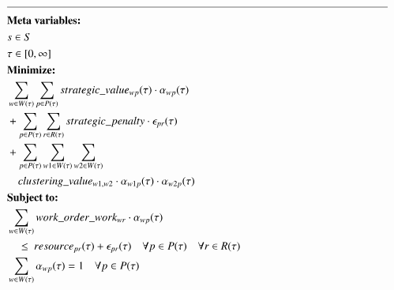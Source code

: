 \begin{alignat}{2}
	& \text{\rule{\linewidth}{0.4pt}} \notag\\
	& \textbf{Meta variables:} \notag\\
	& \ElementScheduler \in \SetScheduler \notag\\
	& \tau \in [0, \infty] \notag\\
	& \textbf{Minimize:} \notag                                                                                                                                                        \\
	& \sum_{\ElementWorkOrder \in \SetWorkOrder{}} \sum_{\ElementPeriod \in \SetPeriod} \ParStrategicValue \cdot \VarStrategicWorkOrderAssignment{\ElementWorkOrder}{\ElementPeriod}  \\ 
	& + \sum_{\ElementPeriod \in \SetPeriod} \sum_{\ElementResource \in \SetResource} \ParStrategicPenalty \cdot \VarStrategicExcess                                                   \\
	& + \sum_{\ElementPeriod \in \SetPeriod} \sum_{\ElementWorkOrder1 \in \SetWorkOrder{}} \sum_{\ElementWorkOrder2 \in \SetWorkOrder{}} \notag                                       \\ 
	& \quad \ParClusteringValue \cdot \VarStrategicWorkOrderAssignment{\ElementWorkOrder1}{\ElementPeriod} \cdot \VarStrategicWorkOrderAssignment{\ElementWorkOrder2}{\ElementPeriod}  \\
	& \textbf{Subject to:} \notag                                                                                                                                                      \\
	& \sum_{\ElementWorkOrder \in \SetWorkOrder{}} \ParStrategicWorkOrderWeight \cdot \VarStrategicWorkOrderAssignment{\ElementWorkOrder}{\ElementPeriod} \notag                      \\ 
	& \quad \leq \ \ParStrategicResource + \VarStrategicExcess \notag                                                                          \quad \forall \ElementPeriod \in \SetPeriod \quad \forall \ElementResource \in \SetResource                                                                                      \\
	& \sum_{\ElementWorkOrder \in \SetWorkOrder{}} \VarStrategicWorkOrderAssignment{\ElementWorkOrder}{\ElementPeriod} = 1 \notag              \quad \forall \ElementPeriod \in \SetPeriod                                                                                                                                      \\

\end{alignat}
